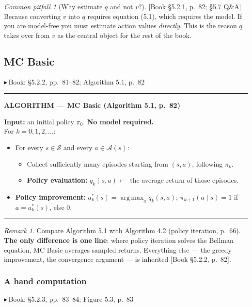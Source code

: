 \documentclass[11pt, letterpaper]{article}
\theoremstyle{runin}
\theoremstyle{runinplain}
\theoremstyle{remark}
\newtheorem*{remark}{Remark}
\newtheorem*{warning}{Common pitfall}
\newcommand{\Sspace}{\mathcal{S}}
\newcommand{\Aspace}{\mathcal{A}}
\newcommand{\argmax}{\operatorname*{arg\,max}}
\newcommand{\bk}[1]{{\color{bookblue}\small$\blacktriangleright$\,\textsf{Book: #1}}}
\newcommand{\bkin}[1]{{\color{bookblue}\small[\textsf{Book #1}]}}
\newenvironment{algobox}[1]
  {\par\medskip\noindent\rule{\textwidth}{0.9pt}\par\nobreak\vspace{0.25em}
   \noindent\textbf{\small ALGORITHM --- #1}\par\nobreak\vspace{0.15em}
   \small}
  {\par\nobreak\vspace{0.25em}\noindent\rule{\textwidth}{0.9pt}\par\medskip}
\begin{document}
\begin{warning}[Why estimate $q$ and not $v$?]
\bkin{\S5.2.1, p.~82; \S5.7 Q\&A} Because converting $v$ into $q$ requires
equation (5.1), which requires the model. If you are model-free you must estimate
action values \emph{directly}. This is the reason $q$ takes over from $v$ as the
central object for the rest of the book.
\end{warning}

\subsection{MC Basic}

\bk{\S5.2.2, pp.~81--82; Algorithm 5.1, p.~82}

\begin{algobox}{MC Basic (Algorithm 5.1, p.~82)}
\textbf{Input:} an initial policy $\pi_0$. \textbf{No model required.}\\
For $k=0,1,2,\dots$:
\begin{itemize}\itemsep0pt
  \item For every $s\in\Sspace$ and every $a\in\Aspace(s)$:
    \begin{itemize}\itemsep0pt
      \item Collect sufficiently many episodes starting from $(s,a)$, following $\pi_k$.
      \item \textbf{Policy evaluation:} $q_k(s,a)\leftarrow$ the average return of
            those episodes.
    \end{itemize}
  \item \textbf{Policy improvement:} $a_k^*(s)=\argmax_a q_k(s,a)$;
        $\pi_{k+1}(a\mid s)=1$ if $a=a_k^*(s)$, else $0$.
\end{itemize}
\end{algobox}

\begin{remark}
Compare Algorithm 5.1 with Algorithm 4.2 (policy iteration, p.~66). \textbf{The
only difference is one line}: where policy iteration solves the Bellman equation,
MC Basic averages sampled returns. Everything else --- the greedy improvement, the
convergence argument --- is inherited \bkin{\S5.2.2, p.~82}.
\end{remark}

\subsubsection{A hand computation}

\bk{\S5.2.3, pp.~83--84; Figure 5.3, p.~83}
\end{document}
